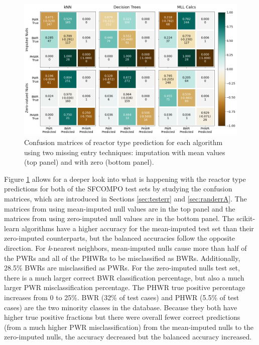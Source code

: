 \begin{figure}[!htb]
  \centering
  \includegraphics[width=\textwidth]{./chapters/exp1/confusion_matrix_sfco.png}
  \caption[Confusion matrices of reactor type classification of 
           \acrshort{SFCOMPO} entries]
          {Confusion matrices of reactor type prediction for each algorithm 
           using two missing entry techniques: imputation with mean values (top 
           panel) and with zero (bottom panel).}
  \label{fig:cm}
\end{figure}

Figure \ref{fig:cm} allows for a deeper look into what is happening with the
reactor type predictions for both of the \gls{SFCOMPO} test sets by studying
the confusion matrices, which are introduced in Sections \ref{sec:testerr} and
\ref{sec:randerrA}.  The matrices from using mean-imputed null values are in
the top panel and the matrices from using zero-imputed null values are in the
bottom panel.  The scikit-learn algorithms have a higher accuracy for the
mean-imputed test set than their zero-imputed counterparts, but the balanced
accuracies follow the opposite direction. For \textit{k}-nearest neighbors,
mean-imputed nulls cause more than half of the \gls{PWR}s and all of the
\gls{PHWR}s to be misclassified as \gls{BWR}s. Additionally, 28.5\% \gls{BWR}s
are misclassified as \gls{PWR}s.  For the zero-imputed nulls test set, there is
a much larger correct \gls{BWR} classification percentage, but also a much
larger \gls{PWR} misclassification percentage. The \gls{PHWR} true positive
percentage increases from 0 to 25\%.  \Gls{BWR} (32\% of test cases) and
\gls{PHWR} (5.5\% of test cases) are the two minority classes in the database.
Because they both have higher true positive fractions but there were overall
fewer correct predictions (from a much higher \gls{PWR} misclassification) from
the mean-imputed nulls to the zero-imputed nulls, the accuracy decreased but
the balanced accuracy increased.

